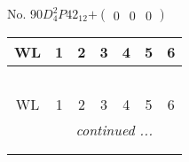 \documentclass[fleqn,9pt,landscape]{jsarticle}
\begin{document}
\newpage
No. 90\quad$D_{4}^{2}$\quad$P42_12$\quad[ tetragonal ]\quad$+\begin{pmatrix} 0 & 0 & 0 \end{pmatrix}$
\begin{center}
\renewcommand{\arraystretch}{1.2}
\begin{longtable}{ccccccc}
 \hline \hline
WL & 1 & 2 & 3 & 4 & 5 & 6 \\ \hline \endfirsthead

\multicolumn{6}{l}{\tablename\ \thetable{}} \\
 \hline \hline
WL & 1 & 2 & 3 & 4 & 5 & 6 \\ \hline \endhead

 \hline \hline
\multicolumn{6}{r}{\footnotesize\it continued ...} \\ \endfoot

 \hline \hline
\multicolumn{6}{r}{} \\ \endlastfoot


\end{longtable}
\end{center}
\end{document}
